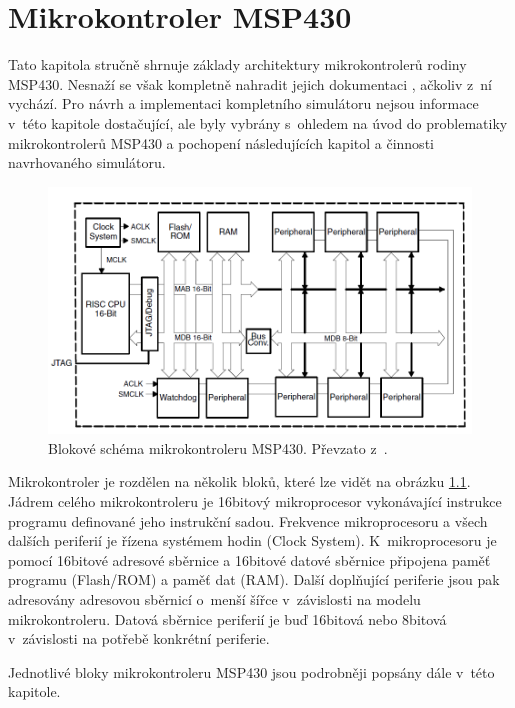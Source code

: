 \chapter{Mikrokontroler MSP430}

Tato kapitola stručně shrnuje základy architektury mikrokontrolerů rodiny MSP430. Nesnaží se však kompletně nahradit jejich dokumentaci \cite{msp430family} \cite{msp430book}, ačkoliv z~ní vychází. Pro návrh a implementaci kompletního simulátoru nejsou informace v~této kapitole dostačující, ale byly vybrány s~ohledem na úvod do problematiky mikrokontrolerů MSP430 a pochopení následujících kapitol a činnosti navrhovaného simulátoru.

\begin{figure}[ht]
\centering
\includegraphics[trim=0cm 0cm 0cm 0cm, scale=0.5]{fig/msp430block}
\caption{Blokové schéma mikrokontroleru MSP430. Převzato z~\cite{msp430family}.}
\label{fig:msp430block}
\end{figure}

Mikrokontroler je rozdělen na několik bloků, které lze vidět na obrázku \ref{fig:msp430block}. Jádrem celého mikrokontroleru je 16bitový mikroprocesor
vykonávající instrukce programu definované jeho instrukční sadou. Frekvence mikroprocesoru a všech dalších periferií je řízena systémem hodin (Clock System). K~mikroprocesoru je pomocí 16bitové adresové sběrnice a 16bitové datové sběrnice připojena paměť programu (Flash/ROM) a paměť dat (RAM). Další doplňující periferie jsou pak adresovány adresovou sběrnicí o~menší šířce v~závislosti na modelu mikrokontroleru. Datová sběrnice periferií je buď 16bitová nebo 8bitová v~závislosti na potřebě konkrétní periferie.

Jednotlivé bloky mikrokontroleru MSP430 jsou podrobněji popsány dále v~této kapitole.

